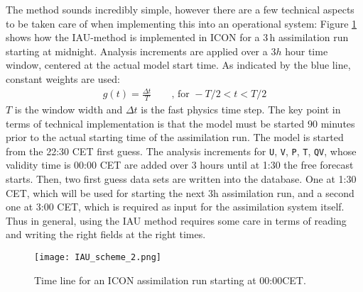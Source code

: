 The method sounds incredibly simple, however there are a few technical aspects to be taken care of when implementing this into an operational 
system: Figure \ref{fig_IAU_scheme} shows how the IAU-method is implemented in ICON for a $3\,\mathrm{h}$ assimilation run starting at midnight. 
Analysis increments are applied over a $3h$ hour time window, centered at the actual model start time. As indicated by the blue line, constant 
weights are used:
\begin{align}
 g(t) = \frac{\Delta t}{T}\qquad \text{, for } -T/2 < t < T/2
\end{align}
$T$ is the window width and $\Delta t$ is the fast physics time step. The key point in terms of technical implementation is that the model 
must be started $90$ minutes prior to the actual starting time of the assimilation run. The model is started from the 22:30 CET first guess. 
The analysis increments for \texttt{U}, \texttt{V}, \texttt{P}, \texttt{T}, \texttt{QV}, whose validity time is 00:00 CET are added over 
$3$ hours until at 1:30 the free forecast starts. Then, two first guess data sets are written into the database. One at 1:30 CET, which will 
be used for starting the next 3h assimilation run, and a second one at 3:00 CET, which is required as input for the assimilation system 
itself. Thus in general, using the IAU method requires some care in terms of reading and writing the right fields at the right times.
\begin{figure}[hbt]
 \centering
 \texttt{[image: IAU\_scheme\_2.png]}
 \caption{Time line for an ICON assimilation run starting at 00:00CET.}\label{fig_IAU_scheme}
\end{figure}

